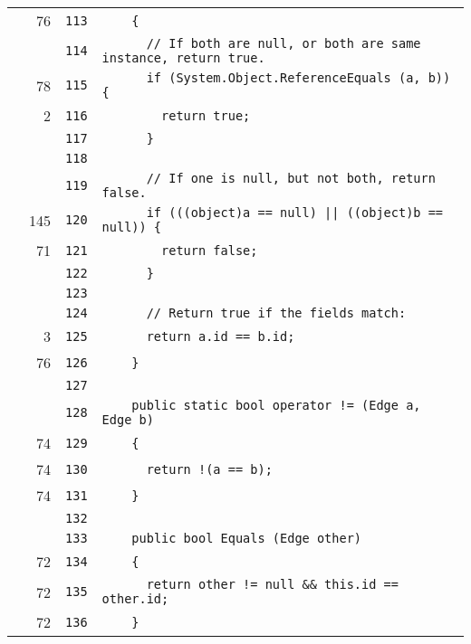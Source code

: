\documentclass[a4paper,10pt]{article}
\begin{document}
\begin{longtable}[l]{lrrl}
\cellcolor{green} & 76 & \verb~113~ & \verb~    {~\\
\cellcolor{gray} &  & \verb~114~ & \verb~      // If both are null, or both are same instance, return true.~\\
\cellcolor{green} & 78 & \verb~115~ & \verb~      if (System.Object.ReferenceEquals (a, b)) {~\\
\cellcolor{green} & 2 & \verb~116~ & \verb~        return true;~\\
\cellcolor{gray} &  & \verb~117~ & \verb~      }~\\
\cellcolor{gray} &  & \verb~118~ & \verb~~\\
\cellcolor{gray} &  & \verb~119~ & \verb~      // If one is null, but not both, return false.~\\
\cellcolor{green} & 145 & \verb~120~ & \verb~      if (((object)a == null) || ((object)b == null)) {~\\
\cellcolor{green} & 71 & \verb~121~ & \verb~        return false;~\\
\cellcolor{gray} &  & \verb~122~ & \verb~      }~\\
\cellcolor{gray} &  & \verb~123~ & \verb~~\\
\cellcolor{gray} &  & \verb~124~ & \verb~      // Return true if the fields match:~\\
\cellcolor{green} & 3 & \verb~125~ & \verb~      return a.id == b.id;~\\
\cellcolor{green} & 76 & \verb~126~ & \verb~    }~\\
\cellcolor{gray} &  & \verb~127~ & \verb~~\\
\cellcolor{gray} &  & \verb~128~ & \verb~    public static bool operator != (Edge a, Edge b)~\\
\cellcolor{green} & 74 & \verb~129~ & \verb~    {~\\
\cellcolor{green} & 74 & \verb~130~ & \verb~      return !(a == b);~\\
\cellcolor{green} & 74 & \verb~131~ & \verb~    }~\\
\cellcolor{gray} &  & \verb~132~ & \verb~~\\
\cellcolor{gray} &  & \verb~133~ & \verb~    public bool Equals (Edge other)~\\
\cellcolor{green} & 72 & \verb~134~ & \verb~    {~\\
\cellcolor{green} & 72 & \verb~135~ & \verb~      return other != null && this.id == other.id;~\\
\cellcolor{green} & 72 & \verb~136~ & \verb~    }~\\

\end{longtable}
\end{document}
